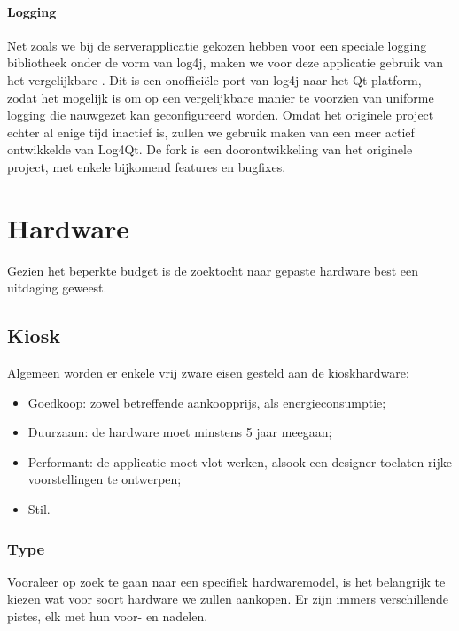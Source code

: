 \subsubsection{Logging}

Net zoals we bij de serverapplicatie gekozen hebben voor een speciale logging bibliotheek onder de vorm van log4j, maken we voor deze applicatie gebruik van het vergelijkbare . Dit is een onofficiële port van log4j naar het Qt platform, zodat het mogelijk is om op een vergelijkbare manier te voorzien van uniforme logging die nauwgezet kan geconfigureerd worden. Omdat het originele project echter al enige tijd inactief is, zullen we gebruik maken van een meer actief ontwikkelde  van Log4Qt. De fork is een doorontwikkeling van het originele project, met enkele bijkomend features en bugfixes.


%
%

\chapter{Hardware}
\label{ontwerp:hardware}

Gezien het beperkte budget is de zoektocht naar gepaste hardware best een uitdaging geweest.

\section{Kiosk}
\label{ontwerp:hardware:kiosk}

Algemeen worden er enkele vrij zware eisen gesteld aan de kioskhardware:
\begin{itemize}
\item Goedkoop: zowel betreffende aankoopprijs, als energieconsumptie;
\item Duurzaam: de hardware moet minstens 5 jaar meegaan;
\item Performant: de applicatie moet vlot werken, alsook een designer toelaten rijke voorstellingen te ontwerpen;
\item Stil.
\end{itemize}

\subsection{Type}

Vooraleer op zoek te gaan naar een specifiek hardwaremodel, is het belangrijk te kiezen wat voor soort hardware we zullen aankopen. Er zijn immers verschillende pistes, elk met hun voor- en nadelen.

